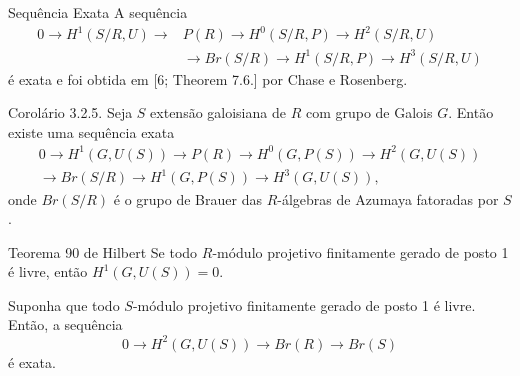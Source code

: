 \documentclass{beamer}
\begin{document}
\begin{frame}{Sequência Exata}
A sequência
    \begin{equation*} \begin{split}
    0 \rightarrow H^1(S/R,U) \rightarrow &P(R) \rightarrow H^0(S/R,P) \rightarrow H^2(S/R,U) \\
    &\rightarrow Br(S/R) \rightarrow H^1(S/R, P)\rightarrow H^3(S/R, U)
\end{split} \end{equation*}
é exata e foi obtida em [6; Theorem 7.6.] por Chase e Rosenberg.
\end{frame}

\begin{frame}{Corolário 3.2.5.}
    Seja $S$ extensão galoisiana de $R$ com grupo de Galois $G$. Então existe uma sequência exata
    \begin{equation*} \begin{split}
    0 \rightarrow H^1(G,U(S)) \rightarrow P(R) \rightarrow H^0(G,P(S)) \rightarrow H^2(G,U(S)) \\
    \rightarrow Br(S/R) \rightarrow H^1(G,P(S)) \rightarrow H^3(G,U(S)),
    \end{split}\end{equation*}
    onde $Br(S/R)$ é o grupo de Brauer das $R$-álgebras de Azumaya fatoradas por $S$.
\end{frame}

\begin{frame}{Teorema 90 de Hilbert}
    Se todo $R$-módulo projetivo finitamente gerado de posto 1 é livre, então $H^1(G,U(S)) = 0$.
\end{frame}

\begin{frame}
    Suponha que todo $S$-módulo projetivo finitamente gerado de posto 1 é livre. Então, a sequência \[0 \rightarrow H^2(G,U(S)) \rightarrow Br(R) \rightarrow Br(S)\] é exata.
\end{frame}

\section{}
\end{document}
